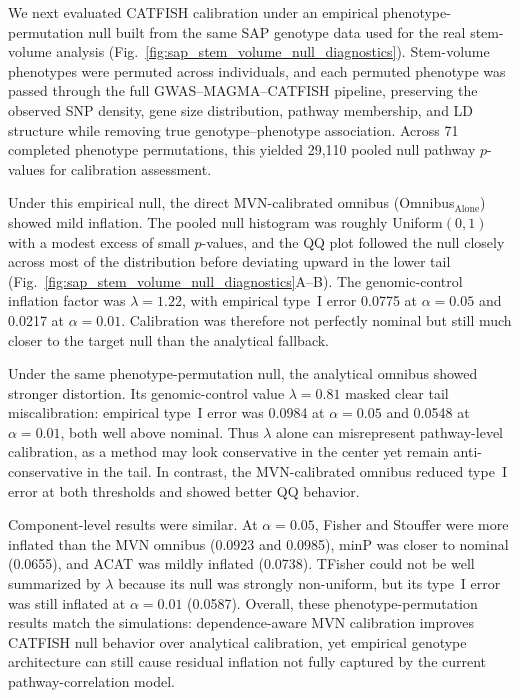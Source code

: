 \documentclass[unnumsec,webpdf,contemporary,large]{oup-authoring-template}%
\theoremstyle{thmstyleone}%
\theoremstyle{thmstyletwo}%
\theoremstyle{thmstylethree}%
\begin{document}
We next evaluated CATFISH calibration under an empirical phenotype-permutation null built from the same SAP genotype data used for the real stem-volume analysis (Fig.~\ref{fig:sap_stem_volume_null_diagnostics}). Stem-volume phenotypes were permuted across individuals, and each permuted phenotype was passed through the full GWAS--MAGMA--CATFISH pipeline, preserving the observed SNP density, gene size distribution, pathway membership, and LD structure while removing true genotype--phenotype association. Across 71 completed phenotype permutations, this yielded 29{,}110 pooled null pathway $p$-values for calibration assessment.

Under this empirical null, the direct MVN-calibrated omnibus (Omnibus\(_\text{Alone}\)) showed mild inflation. The pooled null histogram was roughly Uniform$(0,1)$ with a modest excess of small $p$-values, and the QQ plot followed the null closely across most of the distribution before deviating upward in the lower tail (Fig.~\ref{fig:sap_stem_volume_null_diagnostics}A--B). The genomic-control inflation factor was \(\lambda = 1.22\), with empirical type~I error 0.0775 at \(\alpha=0.05\) and 0.0217 at \(\alpha=0.01\). Calibration was therefore not perfectly nominal but still much closer to the target null than the analytical fallback.

Under the same phenotype-permutation null, the analytical omnibus showed stronger distortion. Its genomic-control value \(\lambda = 0.81\) masked clear tail miscalibration: empirical type~I error was 0.0984 at \(\alpha=0.05\) and 0.0548 at \(\alpha=0.01\), both well above nominal. Thus \(\lambda\) alone can misrepresent pathway-level calibration, as a method may look conservative in the center yet remain anti-conservative in the tail. In contrast, the MVN-calibrated omnibus reduced type~I error at both thresholds and showed better QQ behavior.

Component-level results were similar. At \(\alpha=0.05\), Fisher and Stouffer were more inflated than the MVN omnibus (0.0923 and 0.0985), minP was closer to nominal (0.0655), and ACAT was mildly inflated (0.0738). TFisher could not be well summarized by \(\lambda\) because its null was strongly non-uniform, but its type~I error was still inflated at \(\alpha=0.01\) (0.0587). Overall, these phenotype-permutation results match the simulations: dependence-aware MVN calibration improves CATFISH null behavior over analytical calibration, yet empirical genotype architecture can still cause residual inflation not fully captured by the current pathway-correlation model.
\end{document}

